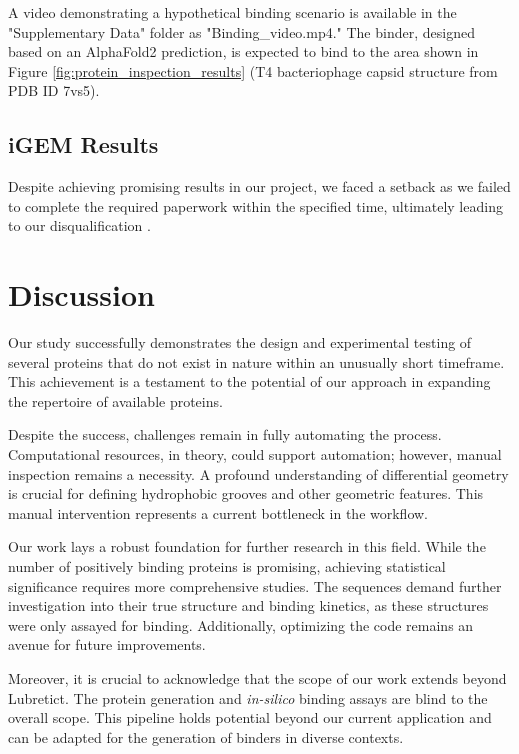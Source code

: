 \documentclass[11pt,a4paper]{article}
\begin{document}
A video demonstrating a hypothetical binding scenario is available in the "Supplementary Data" folder as "Binding\_video.mp4." The binder, designed based on an AlphaFold2 prediction, is expected to bind to the area shown in Figure \ref{fig:protein_inspection_results} (T4 bacteriophage capsid structure from PDB ID 7vs5).


\subsection{iGEM Results}

Despite achieving promising results in our project, we faced a setback as we failed to complete the required paperwork within the specified time, ultimately leading to our disqualification \frownie{}. 

\section{Discussion}

Our study successfully demonstrates the design and experimental testing of several proteins that do not exist in nature within an unusually short timeframe. This achievement is a testament to the potential of our approach in expanding the repertoire of available proteins.

Despite the success, challenges remain in fully automating the process. Computational resources, in theory, could support automation; however, manual inspection remains a necessity. A profound understanding of differential geometry is crucial for defining hydrophobic grooves and other geometric features. This manual intervention represents a current bottleneck in the workflow.

Our work lays a robust foundation for further research in this field. While the number of positively binding proteins is promising, achieving statistical significance requires more comprehensive studies. The sequences demand further investigation into their true structure and binding kinetics, as these structures were only assayed for binding. Additionally, optimizing the code remains an avenue for future improvements.

Moreover, it is crucial to acknowledge that the scope of our work extends beyond Lubretict. The protein generation and \emph{in-silico} binding assays are blind to the overall scope. This pipeline holds potential beyond our current application and can be adapted for the generation of binders in diverse contexts.
\end{document}
